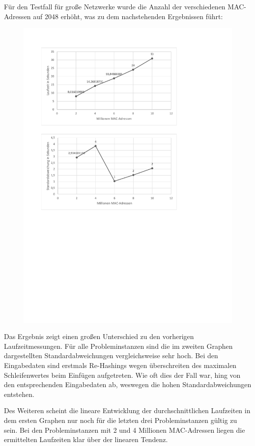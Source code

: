 Für den Testfall für große Netzwerke wurde die Anzahl der verschiedenen MAC-Adressen auf 2048 erhöht, was zu dem nachstehenden Ergebnissen führt:
\begin{figure}[H]
	\hspace*{-1.7cm}\includegraphics[width=1.5\linewidth]{Bilder/benchmark_network_large.pdf}
\end{figure}
\newpage
Das Ergebnis zeigt einen großen Unterschied zu den vorherigen Laufzeitmessungen. Für alle Probleminstanzen sind die im zweiten Graphen dargestellten Standardabweichungen vergleichsweise sehr hoch. Bei den Eingabedaten sind erstmals Re-Hashings wegen überschreiten des maximalen Schleifenwertes beim Einfügen aufgetreten. Wie oft dies der Fall war, hing von den entsprechenden Eingabedaten ab, weswegen die hohen Standardabweichungen entstehen.

Des Weiteren scheint die lineare Entwicklung der durchschnittlichen Laufzeiten in dem ersten Graphen nur noch für die letzten drei Probleminstanzen gültig zu sein. Bei den Probleminstanzen mit 2 und 4 Millionen MAC-Adressen liegen die ermittelten Laufzeiten klar über der linearen Tendenz. 

